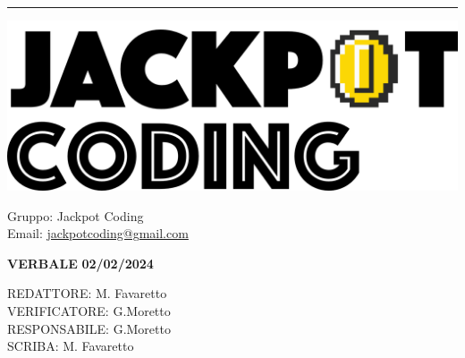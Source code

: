 \documentclass[5pt]{article}
\begin{document}
\hrule
\begin{minipage}[t]{0.50\textwidth}
    \begin{flushleft}
        \hspace{10pt}
        \includegraphics[scale=0.65]{jackpot-logo.png} 
    \end{flushleft}
\end{minipage}
\hspace{-60pt} %
\begin{flushright}
    \begin{minipage}[t]{0.50\textwidth}
        \begin{flushright}
            Gruppo: {\Large Jackpot Coding}\\
            Email: \href{mailto:jackpotcoding@gmail.com}{jackpotcoding@gmail.com}
        \end{flushright}
    \end{minipage}
\end{flushright}

\vspace{15pt}

\begin{center}
    \textbf{\large VERBALE }
    \textbf{\large 02/02/2024} \\
    \textbf{\Large}
\end{center}

\vspace{13pt}

\begin{flushleft}
    \begin{spacing}{1.5}
        REDATTORE:  M. Favaretto \\
        VERIFICATORE:  G.Moretto \\%
        RESPONSABILE:  G.Moretto\\%
        \vspace{7pt}
        SCRIBA: M. Favaretto\\%
    \end{spacing}
\end{flushleft}
\end{document}
